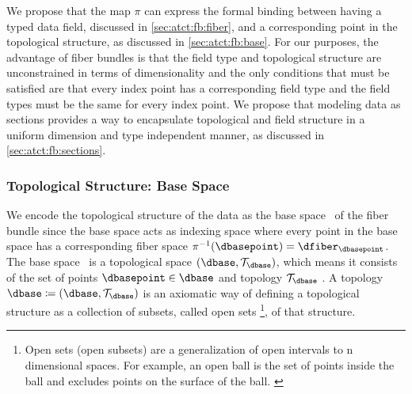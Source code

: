 \documentclass[10pt,journal,compsoc]{IEEEtran}
\theoremstyle{definition}
\theoremstyle{remark}
\begin{document}
We propose that the map $\pi$ can express the formal binding between having a typed data field, discussed in \autoref{sec:atct:fb:fiber}, and a corresponding point in the topological structure, as discussed in \autoref{sec:atct:fb:base}. For our purposes, the advantage of fiber bundles is that the field type and topological structure are unconstrained in terms of dimensionality and the only conditions that must be satisfied are that every index point has a corresponding field type and the field types must be the same for every index point. We propose that modeling data as sections provides a way to encapsulate topological and field structure in a uniform dimension and type independent manner, as discussed in \autoref{sec:atct:fb:sections}.

\subsubsection{Topological Structure: Base Space \dbase}
\label{sec:atct:fb:base}
We encode the topological structure of the data as the \textcolor{base}{base space} \dbase\ of the fiber bundle since the base space acts as indexing space where every point in the base space has a corresponding fiber space $\pi^{-1}(\dbasepoint) = \dfiber_{\dbasepoint}$. The \textcolor{base}{base space} \dbasec\ is a topological space $(\dbase,\mathcal{T}_{\dbase})$, which means it  consists of the set of points ${\dbasepoint \in \dbase}$ and topology $\mathcal{T}_{\dbase}$ \cite{munkresElementsAlgebraicTopology1984}. A topology $\dbase \coloneqq (\dbase,\mathcal{T}_{\dbase})$ is an axiomatic way of defining a topological structure\cite{bradleyTopologyCategoricalApproach2020}  as a collection of subsets, called open sets \footnote{Open sets (open subsets) are a generalization of open intervals to n dimensional spaces. For example, an open ball is the set of points inside the ball and excludes points on the surface of the ball. \cite{weissteinOpenSet}}, of that structure. 
\end{document}

